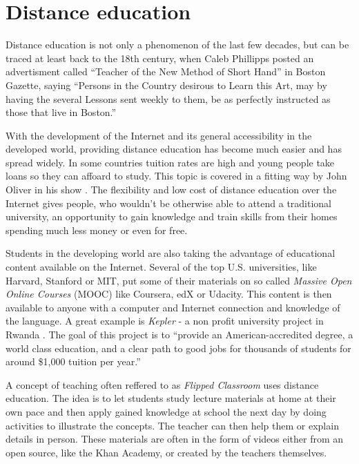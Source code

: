 \chapter{Distance education}

Distance education is not only a phenomenon of the last few decades, but can be traced at least back to the 18th century, when Caleb Phillipps posted an advertisment called ``Teacher of the New Method of Short Hand'' in Boston Gazette, saying ``Persons in the Country desirous to Learn this Art, may by having the several Lessons sent weekly to them, be as perfectly instructed as those that live in Boston.'' \cite{1}

With the development of the Internet and its general accessibility in the developed world, providing distance education has become much easier and has spread widely. In some countries tuition rates are high and young people take loans so they can affoard to study. This topic is covered in a fitting way by John Oliver in his show \cite{2}. The flexibility and low cost of distance education over the Internet gives people, who wouldn't be otherwise able to attend a traditional university, an opportunity to gain knowledge and train skills from their homes \cite{3} spending much less money or even for free.

Students in the developing world are also taking the advantage of educational content available on the Internet. Several of the top U.S. universities, like Harvard, Stanford or MIT, put some of their materials on so called \textit{Massive Open Online Courses} (MOOC)  like Coursera, edX or Udacity. This content is then available to anyone with a computer and Internet connection and knowledge of the language. A great example is \textit{Kepler} - a non profit university project in Rwanda \cite{5}. The goal of this project is to ``provide an American-accredited degree, a world class education, and a clear path to good jobs for thousands of students for around \$1,000 tuition per year.'' \cite{6}

A concept of teaching often reffered to as \textit{Flipped Classroom} uses distance education. The idea is to let students study lecture materials at home at their own pace and then apply gained knowledge at school the next day by doing activities to illustrate the concepts. The teacher can then help them or explain details in person. These materials are often in the form of videos either from an open source, like the Khan Academy, or created by the teachers themselves.

